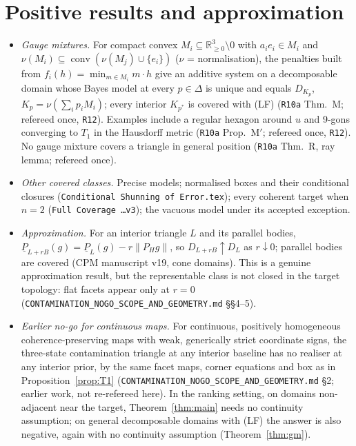 \documentclass[11pt]{article}
\theoremstyle{definition}
\theoremstyle{remark}
\newcommand{\R}{\mathbb R}
\newcommand{\co}{\operatorname{conv}}
\newcommand{\lp}{\underline{P}}
\newcommand{\src}[1]{\texttt{#1}}
\begin{document}
\section{Positive results and approximation}\label{sec:positive}
\begin{sloppypar}
\begin{itemize}[leftmargin=*]
\item \emph{Gauge mixtures.} For compact convex $M_i\subseteq\R^3_{\ge0}\setminus0$ with $a_ie_i\in M_i$ and $\nu(M_i)\subseteq\co(\nu(M_j)\cup\{e_i\})$ ($\nu$ = normalisation), the penalties built from $f_i(h)=\min_{m\in M_i}m\cdot h$ give an additive system on a decomposable domain whose Bayes model at every $p\in\Delta$ is unique and equals $D_{K_p}$, $K_p=\nu(\sum_ip_iM_i)$; every interior $K_{p^*}$ is covered with (LF) (\src{R10a} Thm.~M; refereed once, \src{R12}). Examples include a regular hexagon around $u$ and 9-gons converging to $T_1$ in the Hausdorff metric (\src{R10a} Prop.~M$'$; refereed once, \src{R12}). No gauge mixture covers a triangle in general position (\src{R10a} Thm.~R, ray lemma; refereed once).
\item \emph{Other covered classes.} Precise models; normalised boxes and their conditional closures (\src{Conditional Shunning of Error.tex}); every coherent target when $n=2$ (\src{Full Coverage \dots v3}); the vacuous model under its accepted exception.
\item \emph{Approximation.} For an interior triangle $L$ and its parallel bodies, $\lp_{L+rB}(g)=\lp_L(g)-r\|P_Hg\|$, so $D_{L+rB}\uparrow D_L$ as $r\downarrow0$; parallel bodies are covered (CPM manuscript v19, cone domains). This is a genuine approximation result, but the representable class is not closed in the target topology: flat facets appear only at $r=0$ (\src{CONTAMINATION\_NOGO\_SCOPE\_AND\_GEOMETRY.md} \S\S4--5).
\item \emph{Earlier no-go for continuous maps.} For continuous, positively homogeneous coherence-preserving maps with weak, generically strict coordinate signs, the three-state contamination triangle at any interior baseline has no realiser at any interior prior, by the same facet maps, corner equations and box as in Proposition~\ref{prop:T1} (\src{CONTAMINATION\_NOGO\_SCOPE\_AND\_GEOMETRY.md} \S2; earlier work, not re-refereed here). In the ranking setting, on domains non-adjacent near the target, Theorem~\ref{thm:main} needs no continuity assumption; on general decomposable domains with (LF) the answer is also negative, again with no continuity assumption (Theorem~\ref{thm:gm}).
\end{itemize}
\end{sloppypar}
\end{document}
